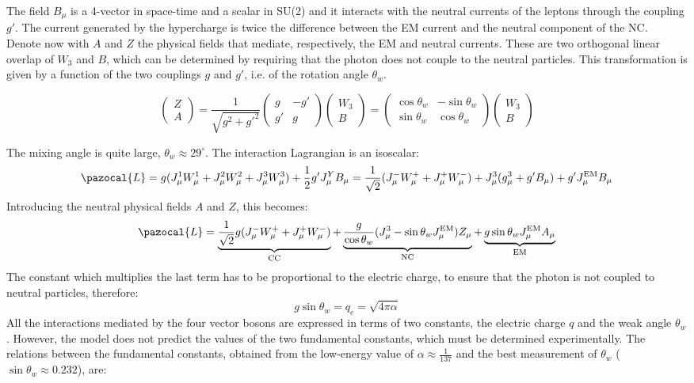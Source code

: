 \documentclass[10.75pt,a4paper,openright,bottom=2cm]{article}
\newcommand{\beginbox}[1]{\begin{tcolorbox}[width=\textwidth,colback={yellow!50},title={#1},colbacktitle={gray!50},coltitle=black]}
\renewcommand{\endbox}{\end{tcolorbox}\noindent}
\begin{document}
The field $B_\mu$ is a 4-vector in space-time and a scalar in SU(2) and it interacts with the neutral currents of the leptons through the coupling $g'$. The current generated by the hypercharge is twice the difference between the EM current and the neutral component of the NC.\\
Denote now with $A$ and $Z$ the physical fields that mediate, respectively, the EM and neutral currents. These are two orthogonal linear overlap of $W_3$ and $B$, which can be determined by requiring that the photon does not couple to the neutral particles. This transformation is given by a function of the two couplings $g$ and $g'$, i.e. of the rotation angle $\theta_w$.
\beginbox{Mixing Angle $\theta_w$}
\[
\begin{pmatrix}
    Z\\A
\end{pmatrix}=\frac{1}{\sqrt{g^2+g'^2}}\begin{pmatrix}
    g & -g'\\g' & g
\end{pmatrix}
\begin{pmatrix}
    W_3\\B
\end{pmatrix}=\begin{pmatrix}
    \cos\theta_w & -\sin\theta_w\\ \sin\theta_w & \cos\theta_w
\end{pmatrix}
\begin{pmatrix}
    W_3\\B
\end{pmatrix}
\]
\endbox
The mixing angle is quite large, $\theta_w\approx29^\circ$. The interaction Lagrangian is an isoscalar:
\[
\pazocal{L}=g(J_\mu^1W_\mu^1+J_\mu^2W_\mu^2+J_\mu^3W_\mu^3)+\frac{1}{2}g'J_\mu^YB_\mu=\frac{1}{\sqrt{2}}(J_\mu^-W_\mu^++J_\mu^+W_\mu^-)+J_\mu^3(g_\mu^3+g'B_\mu)+g'J_\mu^{\text{EM}}B_\mu
\]
Introducing the neutral physical fields $A$ and $Z$, this becomes:
\[
\pazocal{L}=\underbrace{\frac{1}{\sqrt{2}}g(J_\mu^-W_\mu^++J_\mu^+W_\mu^-)}_{\text{CC}}+\underbrace{\frac{g}{\cos\theta_w}(J_\mu^3-\sin\theta_wJ_\mu^{\text{EM}})Z_\mu}_{\text{NC}}+\underbrace{g\sin\theta_wJ_\mu^{\text{EM}}A_\mu}_{\text{EM}}
\]
The constant which multiplies the last term has to be proportional to the electric charge, to ensure that the photon is not coupled to neutral particles, therefore:
\[
g\sin\theta_w=q_e=\sqrt{4\pi\alpha}
\]
All the interactions mediated by the four vector bosons are expressed in terms of two constants, the electric charge $q$ and the weak angle $\theta_w$. However, the model does not predict the values of the two fundamental constants, which must be determined experimentally. The relations between the fundamental constants, obtained from the low-energy value of $\alpha\approx\frac{1}{137}$ and the best measurement of $\theta_w$ ($\sin\theta_w\approx0.232$), are:
\end{document}
